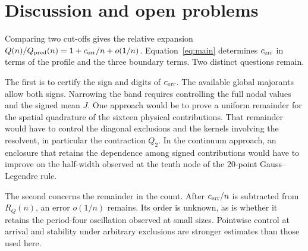 \section{Discussion and open problems}\label{sec:discusion}
Comparing two cut-offs gives the relative expansion \(Q(n)/Q_{\rm pred}(n)=1+c_{\mathrm{err}}/n+o(1/n)\).
Equation~\eqref{eq:main} determines \(c_{\mathrm{err}}\) in terms of the profile and the three boundary terms. Two
distinct questions remain.

The first is to certify the sign and digits of \(c_{\mathrm{err}}\). The available global majorants allow both
signs. Narrowing the band requires controlling the full nodal values and the signed mean \(J\). One
approach would be to prove a uniform remainder for the spatial quadrature of the sixteen physical
contributions. That remainder would have to control the diagonal exclusions and the kernels involving the
resolvent, in particular the contraction \(Q_2\). In the continuum approach, an enclosure that retains
the dependence among signed contributions would have to improve on the half-width observed at the tenth
node of the 20-point Gauss--Legendre rule.

The second concerns the remainder in the count. After \(c_{\mathrm{err}}/n\) is subtracted from \(R_Q(n)\), an error
\(o(1/n)\) remains. Its order is unknown, as is whether it retains the period-four oscillation observed
at small sizes. Pointwise control at arrival and stability under arbitrary exclusions are stronger
estimates than those used here.
